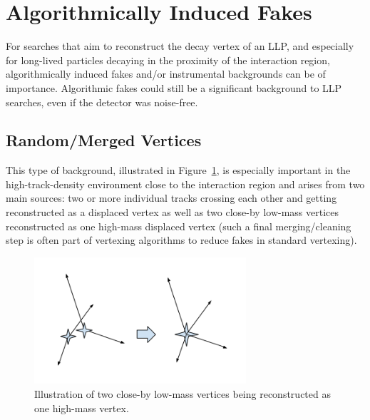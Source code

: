 \section{Algorithmically Induced Fakes} %

For searches that aim to reconstruct the decay vertex of an LLP, and especially for long-lived particles decaying in the proximity of the interaction region, algorithmically induced fakes and/or instrumental backgrounds can be of importance. Algorithmic fakes could still be a significant background to LLP searches, even if the detector was noise-free.

\subsection{Random/Merged Vertices} %

This type of background, illustrated in Figure~\ref{fig:mergedvertices}, is especially important in the high-track-density environment close to the interaction region and arises from two main sources: two or more individual tracks crossing each other and getting reconstructed as a displaced vertex as well as two close-by low-mass vertices reconstructed as one high-mass displaced vertex (such a final merging/cleaning step is often part of vertexing algorithms to reduce fakes in standard vertexing).

\begin{figure}[h]
  \centering
  \includegraphics[width=0.7\textwidth]{figures/mergedvertices.png}
  \caption{Illustration of two close-by low-mass vertices being reconstructed as one high-mass vertex.}
  \label{fig:mergedvertices}
\end{figure}


